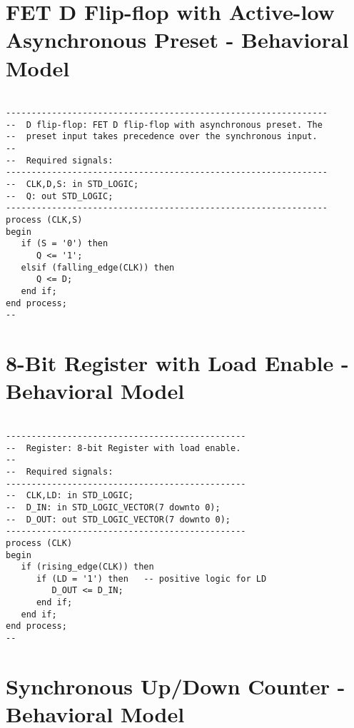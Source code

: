 \section{FET D Flip-flop with Active-low Asynchronous Preset - Behavioral Model}

\noindent
\begin{minipage}{0.99\linewidth}
\begin{lstlisting}

---------------------------------------------------------------
--  D flip-flop: FET D flip-flop with asynchronous preset. The 
--  preset input takes precedence over the synchronous input.
--
--  Required signals: 
---------------------------------------------------------------
--  CLK,D,S: in STD_LOGIC;
--  Q: out STD_LOGIC;
---------------------------------------------------------------
process (CLK,S) 
begin
   if (S = '0') then 
      Q <= '1'; 
   elsif (falling_edge(CLK)) then  
      Q <= D;
   end if;
end process;
--
\end{lstlisting}
\end{minipage}

\section{8-Bit Register with Load Enable - Behavioral Model}

\noindent
\begin{minipage}{0.99\linewidth}
\begin{lstlisting}

-----------------------------------------------
--  Register: 8-bit Register with load enable. 
--
--  Required signals: 
-----------------------------------------------
--  CLK,LD: in STD_LOGIC;
--  D_IN: in STD_LOGIC_VECTOR(7 downto 0);
--  D_OUT: out STD_LOGIC_VECTOR(7 downto 0);
-----------------------------------------------
process (CLK) 
begin
   if (rising_edge(CLK)) then  
      if (LD = '1') then   -- positive logic for LD
         D_OUT <= D_IN;
      end if;
   end if;
end process;
--
\end{lstlisting}
\end{minipage}

\section{Synchronous Up/Down Counter - Behavioral Model}

